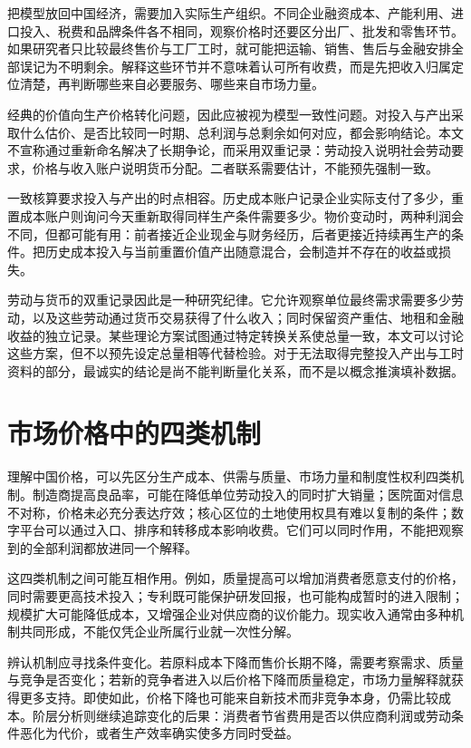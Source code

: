\documentclass[UTF8,fontset=fandol,zihao=-4,oneside,openany]{ctexbook}
\begin{document}
把模型放回中国经济，需要加入实际生产组织。不同企业融资成本、产能利用、进口投入、税费和品牌条件各不相同，观察价格时还要区分出厂、批发和零售环节。如果研究者只比较最终售价与工厂工时，就可能把运输、销售、售后与金融安排全部误记为不明剩余。解释这些环节并不意味着认可所有收费，而是先把收入归属定位清楚，再判断哪些来自必要服务、哪些来自市场力量。

经典的价值向生产价格转化问题，因此应被视为模型一致性问题。对投入与产出采取什么估价、是否比较同一时期、总利润与总剩余如何对应，都会影响结论。本文不宣称通过重新命名解决了长期争论，而采用双重记录：劳动投入说明社会劳动要求，价格与收入账户说明货币分配。二者联系需要估计，不能预先强制一致。

\label{arg:P046}
一致核算要求投入与产出的时点相容。历史成本账户记录企业实际支付了多少，重置成本账户则询问今天重新取得同样生产条件需要多少。物价变动时，两种利润会不同，但都可能有用：前者接近企业现金与财务经历，后者更接近持续再生产的条件。把历史成本投入与当前重置价值产出随意混合，会制造并不存在的收益或损失。

劳动与货币的双重记录因此是一种研究纪律。它允许观察单位最终需求需要多少劳动，以及这些劳动通过货币交易获得了什么收入；同时保留资产重估、地租和金融收益的独立记录。某些理论方案试图通过特定转换关系使总量一致，本文可以讨论这些方案，但不以预先设定总量相等代替检验。对于无法取得完整投入产出与工时资料的部分，最诚实的结论是尚不能判断量化关系，而不是以概念推演填补数据。

\section{市场价格中的四类机制}
理解中国价格，可以先区分生产成本、供需与质量、市场力量和制度性权利四类机制。制造商提高良品率，可能在降低单位劳动投入的同时扩大销量；医院面对信息不对称，价格未必充分表达疗效；核心区位的土地使用权具有难以复制的条件；数字平台可以通过入口、排序和转移成本影响收费。它们可以同时作用，不能把观察到的全部利润都放进同一个解释。

\label{arg:P047}
这四类机制之间可能互相作用。例如，质量提高可以增加消费者愿意支付的价格，同时需要更高技术投入；专利既可能保护研发回报，也可能构成暂时的进入限制；规模扩大可能降低成本，又增强企业对供应商的议价能力。现实收入通常由多种机制共同形成，不能仅凭企业所属行业就一次性分解。

辨认机制应寻找条件变化。若原料成本下降而售价长期不降，需要考察需求、质量与竞争是否变化；若新的竞争者进入以后价格下降而质量稳定，市场力量解释就获得更多支持。即使如此，价格下降也可能来自新技术而非竞争本身，仍需比较成本。阶层分析则继续追踪变化的后果：消费者节省费用是否以供应商利润或劳动条件恶化为代价，或者生产效率确实使多方同时受益。
\end{document}
